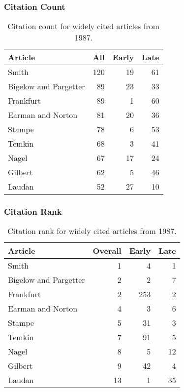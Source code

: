 \documentclass[
  10pt,
  letterpaper,
  DIV=11,
  numbers=noendperiod,
  twoside]{scrartcl}
\begin{document}
\subsubsection*{Citation Count}\label{sec-count-1987}

\begin{longtable}[]{@{}lrrr@{}}

\caption{\label{tbl-citation-count-1987}Citation count for widely cited
articles from 1987.}

\tabularnewline

\toprule\noalign{}
Article & All & Early & Late \\
\midrule\noalign{}
\endhead
\bottomrule\noalign{}
\endlastfoot
Smith & 120 & 19 & 61 \\
Bigelow and Pargetter & 89 & 23 & 33 \\
Frankfurt & 89 & 1 & 60 \\
Earman and Norton & 81 & 20 & 36 \\
Stampe & 78 & 6 & 53 \\
Temkin & 68 & 3 & 41 \\
Nagel & 67 & 17 & 24 \\
Gilbert & 62 & 5 & 46 \\
Laudan & 52 & 27 & 10 \\

\end{longtable}

\subsubsection*{Citation Rank}\label{sec-rank-1987}

\begin{longtable}[]{@{}lrrr@{}}

\caption{\label{tbl-citation-rank-1987}Citation rank for widely cited
articles from 1987.}

\tabularnewline

\toprule\noalign{}
Article & Overall & Early & Late \\
\midrule\noalign{}
\endhead
\bottomrule\noalign{}
\endlastfoot
Smith & 1 & 4 & 1 \\
Bigelow and Pargetter & 2 & 2 & 7 \\
Frankfurt & 2 & 253 & 2 \\
Earman and Norton & 4 & 3 & 6 \\
Stampe & 5 & 31 & 3 \\
Temkin & 7 & 91 & 5 \\
Nagel & 8 & 5 & 12 \\
Gilbert & 9 & 42 & 4 \\
Laudan & 13 & 1 & 35 \\

\end{longtable}
\end{document}
